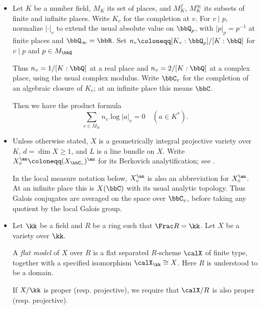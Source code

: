 \begin{notation}[label=\labelNFM{not:berkovich-space-and-a-geometry}, status=draft, tag=0000000]
\begin{itemize}
\begin{latexmathchange}
		      \end{latexmathchange}
		\item Let $K$ be a number field, $M_K$ its set of places, and $M_K^f$, $M_K^\infty$ its subsets of finite and infinite places.
		      Write $K_v$ for the completion at $v$.
		      For $v \mid p$, normalize $|\cdot|_v$ to extend the usual absolute value on $\bbQ_p$, with $|p|_p = p^{-1}$ at finite places and $\bbQ_\infty = \bbR$.
		      Set $n_v \coloneqq [K_v:\bbQ_p]/[K:\bbQ]$ for $v \mid p$ and $p \in M_\bbQ$  \Yang{}
		      \begin{latexmathchange}
		      Thus $n_v = 1/[K:\bbQ]$ at a real place and $n_v = 2/[K:\bbQ]$ at a complex place, using the usual complex modulus.
		      Write $\bbC_v$ for the completion of an algebraic closure of $K_v$; at an infinite place this means $\bbC$.
		      \end{latexmathchange}
		      Then we have the product formula
		      \[ \sum_{v \in M_K}n_v\log|a|_v = 0 \quad (a \in K^*). \]
		\item Unless otherwise stated, $X$ is a geometrically integral projective variety over $K$, $d = \dim X \geq 1$, and $L$ is a line bundle on $X$.
		      Write $X_{\bar{v}}^\an \coloneqq (X_{\bbC_v})^\an$ for its Berkovich analytification; see \Yang{}.
		      \begin{latexmathchange}
		      In the local measure notation below, $X_v^\an$ is also an abbreviation for $X_{\bar v}^\an$.
		      At an infinite place this is $X(\bbC)$ with its usual analytic topology.
		      Thus Galois conjugates are averaged on the space over $\bbC_v$, before taking any quotient by the local Galois group.
		      \end{latexmathchange}

		\item Let $\kk$ be a field and $R$ be a ring such that $\Frac R = \kk$.
		      Let $X$ be a variety over $\kk$.
		      \begin{latexmathchange}
		      A \emph{flat model} of $X$ over $R$ is a flat separated $R$-scheme $\calX$ of finite type, together with a specified isomorphism $\calX_\kk \cong X$.
		      Here $R$ is understood to be a domain.
		      \end{latexmathchange}
		      If $X/\kk$ is proper (resp. projective), we require that $\calX/R$ is also proper (resp. projective).
		      \Yang{}
	\end{itemize}
	\Yang{}
\end{notation}

